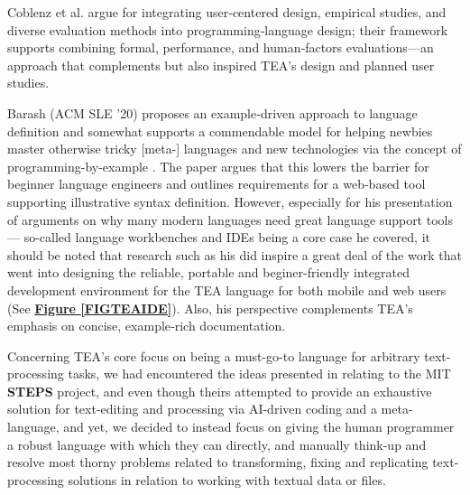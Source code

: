 \documentclass[acmtoplas]{acmart}
\begin{document}
Coblenz et al. \cite{coblenz2018interdisciplinary} argue for integrating user‑centered design, empirical studies, and diverse evaluation methods into programming‑language design; their framework supports combining formal, performance, and human‑factors evaluations—an approach that complements but also inspired TEA’s design and planned user studies.


Barash (ACM SLE '20) \cite{barash2020exampledriven} proposes an example‑driven approach to language definition and somewhat supports a commendable model for helping newbies master otherwise tricky [meta-] languages and new technologies via the concept of programming-by-example \cite{yessenov2013colorful}. The paper argues that this lowers the barrier for beginner language engineers and outlines requirements for a web‑based tool supporting illustrative syntax definition. However, especially for his presentation of arguments on why many modern languages need great language support tools --- so-called language workbenches and IDEs being a core case he covered, it should be noted that research such as his did inspire a great deal of the work that went into designing the reliable, portable and beginer-friendly integrated development environment for the TEA language for both mobile and web users (See \textbf{\hyperref[FIGTEAIDE]{Figure \ref{FIGTEAIDE}}}). Also, his perspective complements TEA’s emphasis on concise, example‑rich documentation.

Concerning TEA's core focus on being a must-go-to language for arbitrary text-processing tasks, we had encountered the ideas presented in \cite{yessenov2013colorful} relating to the MIT \textbf{STEPS} project, and even though theirs attempted to provide an exhaustive solution for text-editing and processing via AI-driven coding and a meta-language, and yet, we decided to instead focus on giving the human programmer a robust language with which they can directly, and manually think-up and resolve most thorny problems related to transforming, fixing and replicating text-processing solutions in relation to working with textual data or files.
\end{document}
